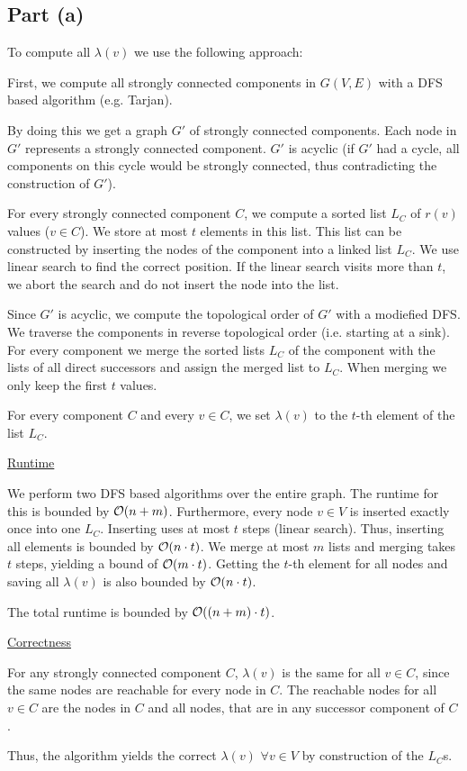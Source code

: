 \subsection*{Part (a)}

To compute all $\lambda(v)$ we use the following approach:

First, we compute all strongly connected components in $G(V,E)$ with a DFS based algorithm (e.g. Tarjan).

By doing this we get a graph $G'$ of strongly connected components. Each node in $G'$ represents a strongly connected component. $G'$ is acyclic (if $G'$ had a cycle, all components on this cycle would be strongly connected, thus contradicting the construction of $G'$). 

For every strongly connected component $C$, we compute a sorted list $L_C$ of $r(v)$ values ($v \in C$). We store at most $t$ elements in this list. This list can be constructed by inserting the nodes of the component into a linked list $L_C$. We use linear search to find the correct position. If the linear search visits more than $t$, we abort the search and do not insert the node into the list.

Since $G'$ is acyclic, we compute the topological order of $G'$ with a modiefied DFS. We traverse the components in reverse topological order (i.e. starting at a sink). For every component we merge the sorted lists $L_C$ of the component with the lists of all direct successors and assign the merged list to $L_C$. When merging we only keep the first $t$ values.

For every component $C$ and every $v \in C$, we set $\lambda(v)$ to the $t$-th element of the list $L_C$.

\underline{Runtime}

We perform two DFS based algorithms over the entire graph. The runtime for this is bounded by $\mathcal{O}(n + m)$. Furthermore, every node $v \in V$ is inserted exactly once into one $L_C$. Inserting uses at most $t$ steps (linear search). Thus, inserting all elements is bounded by $\mathcal{O}(n\cdot t)$. We merge at most $m$ lists and merging takes $t$ steps, yielding a bound of $\mathcal{O}(m\cdot t)$.
Getting the $t$-th element for all nodes and saving all $\lambda(v)$ is also bounded by $\mathcal{O}(n\cdot t)$.

The total runtime is bounded by $\mathcal{O}((n + m) \cdot t)$.

\underline{Correctness}

For any strongly connected component $C$, $\lambda(v)$ is the same for all $v \in C$, since the same nodes are reachable for every node in $C$.
The reachable nodes for all $v \in C$ are the nodes in $C$ and all nodes, that are in any successor component of $C$.

Thus, the algorithm yields the correct $\lambda(v)$ $\forall v \in V$ by construction of the $L_C$s.

\pagebreak